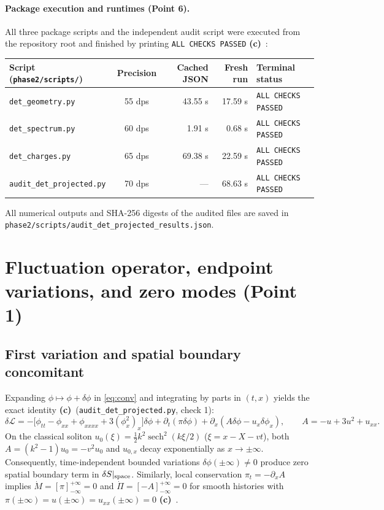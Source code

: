 \documentclass[11pt,a4paper]{article}
\newcommand{\Lc}{\textsf{\textbf{(c)}}\ }
\newcommand{\scr}{\texttt{audit\_\allowbreak det\_\allowbreak projected.py}}
\newcommand{\G}{\texttt{det\_\allowbreak geometry.py}}
\newcommand{\Scheck}{\texttt{det\_\allowbreak spectrum.py}}
\newcommand{\Ccheck}{\texttt{det\_\allowbreak charges.py}}
\begin{document}
\paragraph{Package execution and runtimes (Point 6).}
All three package scripts and the independent audit script were executed from
the repository root and finished by printing \texttt{ALL CHECKS PASSED} \Lc:
\begin{center}\small
\begin{tabular}{@{}lcrrl@{}}\toprule
Script (\texttt{phase2/scripts/}) & Precision & Cached JSON & Fresh run & Terminal status\\\midrule
\G & 55 dps & 43.55 s & 17.59 s & \texttt{ALL CHECKS PASSED}\\
\Scheck & 60 dps & 1.91 s & 0.68 s & \texttt{ALL CHECKS PASSED}\\
\Ccheck  & 65 dps & 69.38 s & 22.59 s & \texttt{ALL CHECKS PASSED}\\
\scr & 70 dps & --- & 68.63 s & \texttt{ALL CHECKS PASSED}\\\bottomrule
\end{tabular}
\end{center}
All numerical outputs and SHA-256 digests of the audited files are saved in
\texttt{phase2/\allowbreak scripts/\allowbreak audit\_\allowbreak det\_\allowbreak projected\_\allowbreak results.json}.

\section{Fluctuation operator, endpoint variations, and zero modes (Point 1)}
\subsection{First variation and spatial boundary concomitant}
Expanding $\phi\mapsto\phi+\delta\phi$ in \eqref{eq:conv} and integrating by
parts in $(t,x)$ yields the exact identity \Lc (\scr, check 1):
\begin{equation}\label{eq:ibp1}
 \delta\mathcal L = -\big[\phi_{tt}-\phi_{xx}+\phi_{xxxx}+3(\phi_x^2)_x\big]\delta\phi
 +\partial_t(\pi\delta\phi)+\partial_x(A\delta\phi-u_x\delta\phi_x),\qquad
 A=-u+3u^2+u_{xx}.
\end{equation}
On the classical soliton $u_0(\xi)=\tfrac12k^2\operatorname{sech}^2(k\xi/2)$
($\xi=x-X-vt$), both $A=(k^2-1)u_0=-v^2u_0$ and $u_{0,x}$ decay exponentially
as $x\to\pm\infty$. Consequently, time-independent bounded variations
$\delta\phi(\pm\infty)\ne0$ produce zero spatial boundary term in
$\delta S|_{\rm space}$. Similarly, local conservation $\pi_t=-\partial_x A$
implies $\dot M=[\pi]_{-\infty}^{+\infty}=0$ and
$\dot\Pi=[-A]_{-\infty}^{+\infty}=0$ for smooth histories with
$\pi(\pm\infty)=u(\pm\infty)=u_{xx}(\pm\infty)=0$ \Lc.
\end{document}
